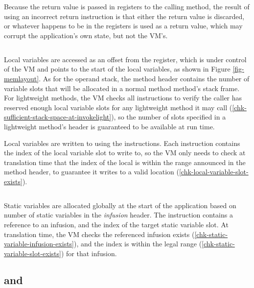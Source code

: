 Because the return value is passed in registers to the calling method, the result of using an incorrect return instruction is that either the return value is discarded, or whatever happens to be in the registers is used as a return value, which may corrupt the application's own state, but not the VM's.

\subsection{}
Local variables are accessed as an offset from the  register, which is under control of the VM and points to the start of the local variables, as shown in Figure \ref{fig-memlayout}. As for the operand stack, the method header contains the number of variable slots that will be allocated in a normal method method's stack frame. For lightweight methods, the VM checks all  instructions to verify the caller has reserved enough local variable slots for any lightweight method it may call (\ref{chk-sufficient-stack-space-at-invokelight}), so the number of slots specified in a lightweight method's header is guaranteed to be available at run time.

Local variables are written to using the  instructions. Each  instruction contains the index of the local variable slot to write to, so the VM only needs to check at translation time that the index of the local is within the range announced in the method header, to guarantee it writes to a valid location (\ref{chk-local-variable-slot-exists}).

\subsection{}
Static variables are allocated globally at the start of the application based on number of static variables in the \emph{infusion} header. The  instruction contains a reference to an infusion, and the index of the target static variable slot. At translation time, the VM checks the referenced infusion exists (\ref{chk-static-variable-infusion-exists}), and the index is within the legal range (\ref{chk-static-variable-slot-exists}) for that infusion.

\subsection{ and }
\label{sec-safety-heap-access}

